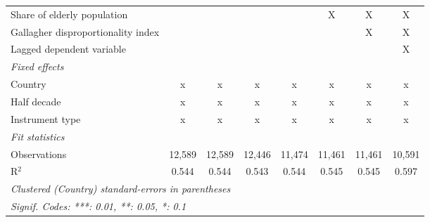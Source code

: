 \begin{tabular}{lccccccc}
   Share of elderly population                                   &                &                &                &                & X              & X              & X\\  
   Gallagher disproportionality index                            &                &                &                &                &                & X              & X\\  
   Lagged dependent variable                                     &                &                &                &                &                &                & X\\  
   \emph{Fixed effects}\\
   Country                                                       & x              & x              & x              & x              & x              & x              & x\\  
   Half decade                                                   & x              & x              & x              & x              & x              & x              & x\\  
   Instrument type                                               & x              & x              & x              & x              & x              & x              & x\\  
   \midrule \emph{Fit statistics}\\
   Observations                                                  & 12,589         & 12,589         & 12,446         & 11,474         & 11,461         & 11,461         & 10,591\\  
   R$^2$                                                         & 0.544          & 0.544          & 0.543          & 0.544          & 0.545          & 0.545          & 0.597\\  
   \midrule
   \multicolumn{8}{l}{\emph{Clustered (Country) standard-errors in parentheses}}\\
   \multicolumn{8}{l}{\emph{Signif. Codes: ***: 0.01, **: 0.05, *: 0.1}}\\
\end{tabular}
\par\endgroup


